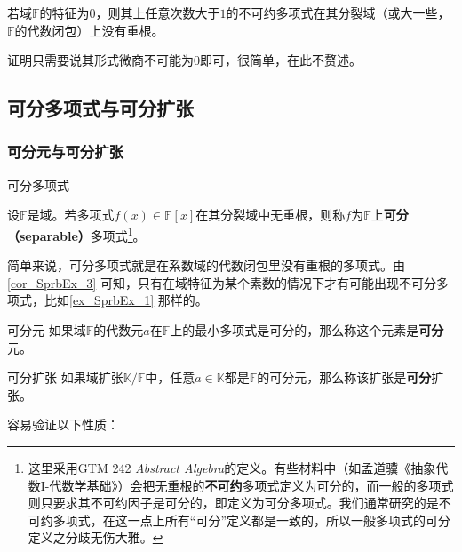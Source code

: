 \begin{corollary}{}\label{cor_SprbEx_3}

若域$\mathbb{F}$的特征为$0$，则其上任意次数大于$1$的不可约多项式在其分裂域（或大一些，$\mathbb{F}$的代数闭包）上没有重根。

\end{corollary}

证明只需要说其形式微商不可能为$0$即可，很简单，在此不赘述。




\subsection{可分多项式与可分扩张}



\subsubsection{可分元与可分扩张}



\begin{definition}{可分多项式}\label{def_SprbEx_2}

设$\mathbb{F}$是域。若多项式$f(x)\in\mathbb{F}[x]$在其分裂域中无重根，则称$f$为$\mathbb{F}$上\textbf{可分（separable）}多项式\footnote{这里采用GTM 242 \textsl{Abstract Algebra}的定义。有些材料中（如孟道骥《抽象代数I-代数学基础》）会把无重根的\textbf{不可约}多项式定义为可分的，而一般的多项式则只要求其不可约因子是可分的，即定义为可分多项式。我们通常研究的是不可约多项式，在这一点上所有“可分”定义都是一致的，所以一般多项式的可分定义之分歧无伤大雅。}。


\end{definition}

简单来说，可分多项式就是在系数域的代数闭包里没有重根的多项式。由\autoref{cor_SprbEx_3} 可知，只有在域特征为某个素数的情况下才有可能出现不可分多项式，比如\autoref{ex_SprbEx_1} 那样的。


\begin{definition}{可分元}
如果域$\mathbb{F}$的代数元$a$在$\mathbb{F}$上的最小多项式是可分的，那么称这个元素是\textbf{可分}元。
\end{definition}

\begin{definition}{可分扩张}\label{def_SprbEx_4}
如果域扩张$\mathbb{K}/\mathbb{F}$中，任意$a\in\mathbb{K}$都是$\mathbb{F}$的可分元，那么称该扩张是\textbf{可分}扩张。
\end{definition}

容易验证以下性质：

